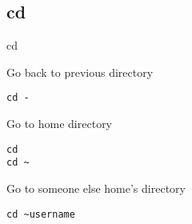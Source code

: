 \subsection{cd}

\begin{frame}[fragile]{cd}
  \begin{exampleblock}{Go back to previous directory}
    \begin{lstlisting}[showstringspaces=false,basicstyle=\tiny]
cd -
    \end{lstlisting}
  \end{exampleblock}
  \pause

  \begin{exampleblock}{Go to home directory}
    \begin{lstlisting}[showstringspaces=false,basicstyle=\tiny]
cd
cd ~
    \end{lstlisting}
  \end{exampleblock}
  \pause

  \begin{exampleblock}{Go to someone else home's directory}
    \begin{lstlisting}[showstringspaces=false,basicstyle=\tiny]
cd ~username
    \end{lstlisting}
  \end{exampleblock}
\end{frame}
